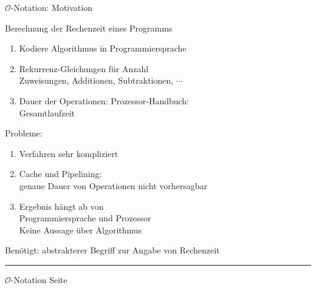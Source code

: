 \documentclass{slides}
\newcommand{\Oh}{\mathcal{O}}
\newcounter{mypage}
\begin{document}

\begin{slide}{}
\begin{center}
$\Oh$-Notation: Motivation
\end{center}

\footnotesize
Berechnung der Rechenzeit eines Programms
\begin{enumerate}
\item Kodiere Algorithmus in Programmiersprache
\item Rekurrenz-Gleichungen f\"ur Anzahl 
      \\[0.3cm]
      \hspace*{1.3cm}
      Zuweisungen, Additionen, Subtraktionen, $\cdots$
\item Dauer der Operationen: Prozessor-Handbuch:
      \\[0.3cm]
      \hspace*{1.3cm} Gesamtlaufzeit
\end{enumerate}
Probleme:
\begin{enumerate}
\item Verfahren sehr kompliziert
\item Cache und Pipelining: 
      \\[0.3cm]
      \hspace*{0.3cm}
      genaue Dauer von Operationen nicht vorhersagbar
\item Ergebnis h\"angt ab von 
      \\[0.3cm]
      \hspace*{1.3cm} Programmiersprache und Prozessor
      \\[0.3cm]
      Keine Aussage \"uber Algorithmus
\end{enumerate}
Ben\"otigt: abstrakterer Begriff zur Angabe von Rechenzeit

\vspace*{\fill}
\tiny \addtocounter{mypage}{1}
\rule{17cm}{1mm}
$\Oh$-Notation  \hspace*{\fill} Seite 
\end{slide}

\end{document}
